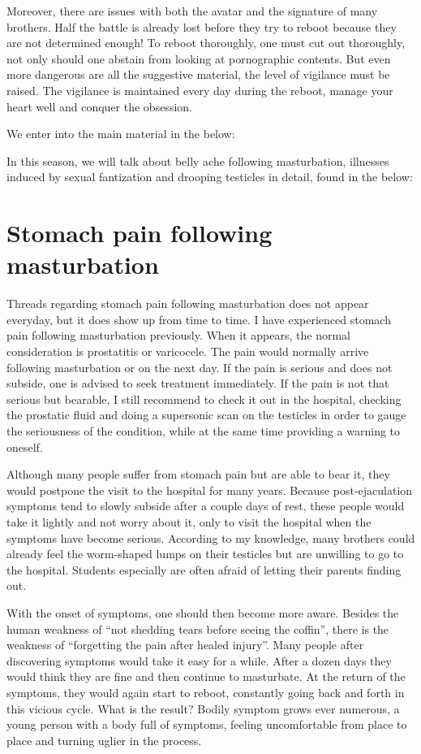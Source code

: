 \documentclass[
]{book}
\begin{document}
Moreover, there are issues with both the avatar and the signature of many brothers. Half the battle is already lost before they try to reboot because they are not determined enough! To reboot thoroughly, one must cut out thoroughly, not only should one abstain from looking at pornographic contents. But even more dangerous are all the suggestive material, the level of vigilance must be raised. The vigilance is maintained every day during the reboot, manage your heart well and conquer the obsession.

We enter into the main material in the below:

In this season, we will talk about belly ache following masturbation, illnesses induced by sexual fantization and drooping testicles in detail, found in the below:

\hypertarget{stomach-pain-following-masturbation}{%
\section{Stomach pain following masturbation}\label{stomach-pain-following-masturbation}}

Threads regarding stomach pain following masturbation does not appear everyday, but it does show up from time to time. I have experienced stomach pain following masturbation previously. When it appears, the normal consideration is prostatitis or varicocele. The pain would normally arrive following masturbation or on the next day. If the pain is serious and does not subside, one is advised to seek treatment immediately. If the pain is not that serious but bearable, I still recommend to check it out in the hospital, checking the prostatic fluid and doing a supersonic scan on the testicles in order to gauge the seriousness of the condition, while at the same time providing a warning to oneself.

Although many people suffer from stomach pain but are able to bear it, they would postpone the visit to the hospital for many years. Because post-ejaculation symptoms tend to slowly subside after a couple days of rest, these people would take it lightly and not worry about it, only to visit the hospital when the symptoms have become serious. According to my knowledge, many brothers could already feel the worm-shaped lumps on their testicles but are unwilling to go to the hospital. Students especially are often afraid of letting their parents finding out.

With the onset of symptoms, one should then become more aware. Besides the human weakness of ``not shedding tears before seeing the coffin'', there is the weakness of ``forgetting the pain after healed injury''. Many people after discovering symptoms would take it easy for a while. After a dozen days they would think they are fine and then continue to masturbate. At the return of the symptoms, they would again start to reboot, constantly going back and forth in this vicious cycle. What is the result? Bodily symptom grows ever numerous, a young person with a body full of symptoms, feeling uncomfortable from place to place and turning uglier in the process.
\end{document}
